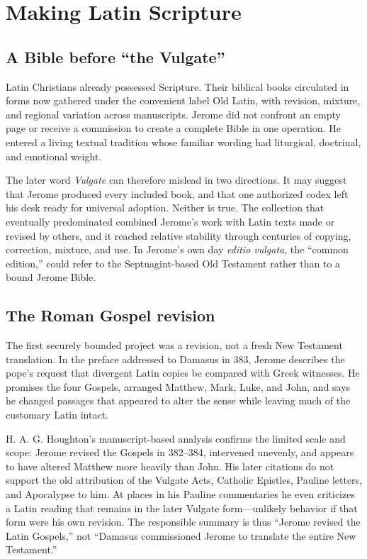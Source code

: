 \section{Making Latin Scripture}\label{sec:jerome-scripture}

\subsection{A Bible before ``the Vulgate''}

Latin Christians already possessed Scripture. Their biblical books circulated
in forms now gathered under the convenient label Old Latin, with revision,
mixture, and regional variation across manuscripts. Jerome did not confront an
empty page or receive a commission to create a complete Bible in one operation.
He entered a living textual tradition whose familiar wording had liturgical,
doctrinal, and emotional weight.

The later word \emph{Vulgate} can therefore mislead in two directions. It may
suggest that Jerome produced every included book, and that one authorized codex
left his desk ready for universal adoption. Neither is true. The collection
that eventually predominated combined Jerome's work with Latin texts made or
revised by others, and it reached relative stability through centuries of
copying, correction, mixture, and use. In Jerome's own day \emph{editio
vulgata}, the ``common edition,'' could refer to the Septuagint-based Old
Testament rather than to a bound Jerome Bible.

\subsection{The Roman Gospel revision}

The first securely bounded project was a revision, not a fresh New Testament
translation. In the preface addressed to Damasus in 383, Jerome describes the
pope's request that divergent Latin copies be compared with Greek witnesses.
He promises the four Gospels, arranged Matthew, Mark, Luke, and John, and says
he changed passages that appeared to alter the sense while leaving much of the
customary Latin intact.

H. A. G. Houghton's manuscript-based analysis confirms the limited scale and
scope: Jerome revised the Gospels in 382--384, intervened unevenly, and appears
to have altered Matthew more heavily than John. His later citations do not
support the old attribution of the Vulgate Acts, Catholic Epistles, Pauline
letters, and Apocalypse to him. At places in his Pauline commentaries he even
criticizes a Latin reading that remains in the later Vulgate form---unlikely
behavior if that form were his own revision. The responsible summary is thus
``Jerome revised the Latin Gospels,'' not ``Damasus commissioned Jerome to
translate the entire New Testament.''

